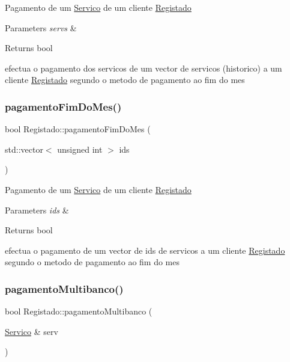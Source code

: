 Pagamento de um \hyperlink{class_servico}{Servico} de um cliente \hyperlink{class_registado}{Registado}


\begin{DoxyParams}{Parameters}
{\em servs} & \\
\hline
\end{DoxyParams}
\begin{DoxyReturn}{Returns}
bool
\end{DoxyReturn}
efectua o pagamento dos servicos de um vector de servicos (historico) a um cliente \hyperlink{class_registado}{Registado} segundo o metodo de pagamento ao fim do mes \hypertarget{class_registado_a0ee7364d85601f95bfe6bf45c062ec06}{}\label{class_registado_a0ee7364d85601f95bfe6bf45c062ec06} 
\subsubsection{\texorpdfstring{pagamento\+Fim\+Do\+Mes()}{pagamentoFimDoMes()}\hspace{0.1cm}{\footnotesize\ttfamily [2/2]}}
{\footnotesize\ttfamily bool Registado\+::pagamento\+Fim\+Do\+Mes (\begin{DoxyParamCaption}\item[{std\+::vector$<$ unsigned int $>$}]{ids }\end{DoxyParamCaption})\hspace{0.3cm}{\ttfamily [virtual]}}

Pagamento de um \hyperlink{class_servico}{Servico} de um cliente \hyperlink{class_registado}{Registado}


\begin{DoxyParams}{Parameters}
{\em ids} & \\
\hline
\end{DoxyParams}
\begin{DoxyReturn}{Returns}
bool
\end{DoxyReturn}
efectua o pagamento de um vector de ids de servicos a um cliente \hyperlink{class_registado}{Registado} segundo o metodo de pagamento ao fim do mes \hypertarget{class_registado_a36be4ccf8e4b1bc26be7c1c2d4612229}{}\label{class_registado_a36be4ccf8e4b1bc26be7c1c2d4612229} 
\subsubsection{\texorpdfstring{pagamento\+Multibanco()}{pagamentoMultibanco()}\hspace{0.1cm}{\footnotesize\ttfamily [1/2]}}
{\footnotesize\ttfamily bool Registado\+::pagamento\+Multibanco (\begin{DoxyParamCaption}\item[{\hyperlink{class_servico}{Servico} \&}]{serv }\end{DoxyParamCaption})\hspace{0.3cm}{\ttfamily [virtual]}}

